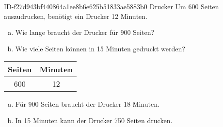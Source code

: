 \begin{exercise}
      {ID-f27d943bf440864a1ee8b6e625b51833ae5883b0}
      {Drucker}
  \ifproblem\problem
    Um \num{600} Seiten auszudrucken, benötigt ein Drucker \num{12} Minuten.
    \begin{enumerate}[a)]
      \item Wie lange braucht der Drucker für \num{900} Seiten?
      \item Wie viele Seiten können in \num{15} Minuten gedruckt werden?
    \end{enumerate}
  \fi
  \ifoutline\outline
    \begin{tabular}{c|c}
      Seiten & Minuten \\
      \hline
         600 & 12
    \end{tabular}
  \fi
  \ifoutcome\outcome
    \begin{enumerate}[a)]
      \item Für \num{900} Seiten braucht der Drucker \num{18} Minuten.
      \item In \num{15} Minuten kann der Drucker \num{750} Seiten drucken.
    \end{enumerate}
  \fi
\end{exercise}
